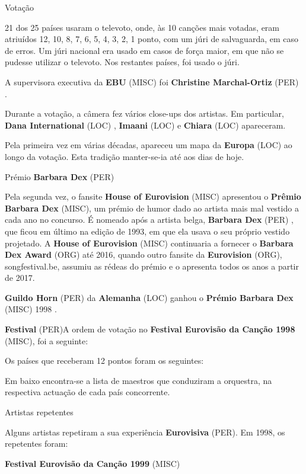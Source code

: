 \documentclass[12pt,a4paper]{article}
\begin{document}
Votação

21 dos 25 países usaram o televoto, onde, às 10 canções mais votadas, eram atriuídos 12, 10, 8, 7, 6, 5, 4, 3, 2, 1 ponto, com um júri de salvaguarda, em caso de erros. Um júri nacional era usado em casos de força maior, em que não se pudesse utilizar o televoto. Nos restantes países, foi usado o júri.

A supervisora executiva da \textbf{EBU} (MISC) foi \textbf{Christine Marchal-Ortiz} (PER) .

Durante a votação, a câmera fez vários close-ups dos artistas. Em particular, \textbf{Dana International} (LOC) , \textbf{Imaani} (LOC) e \textbf{Chiara} (LOC) apareceram.

Pela primeira vez em várias décadas, apareceu um mapa da \textbf{Europa} (LOC) ao longo da votação. Esta tradição manter-se-ia até aos dias de hoje.



Prémio \textbf{Barbara Dex} (PER)

Pela segunda vez, o fansite \textbf{House of Eurovision} (MISC) apresentou o \textbf{Prêmio Barbara Dex} (MISC), um prémio de humor dado ao artista mais mal vestido a cada ano no concurso. É nomeado após a artista belga, \textbf{Barbara Dex} (PER) , que ficou em último na edição de 1993, em que ela usava o seu próprio vestido projetado. A \textbf{House of Eurovision} (MISC) continuaria a fornecer o \textbf{Barbara Dex Award} (ORG) até 2016, quando outro fansite da \textbf{Eurovision} (ORG), songfestival.be, assumiu as rédeas do prémio e o apresenta todos os anos a partir de 2017.

\textbf{Guildo Horn} (PER) da \textbf{Alemanha} (LOC) ganhou o \textbf{Prémio Barbara Dex} (MISC) 1998 .



\textbf{Festival} (PER)A ordem de votação no \textbf{Festival Eurovisão da Canção 1998} (MISC), foi a seguinte:

Os países que receberam 12 pontos foram os seguintes:

Em baixo encontra-se a lista de maestros que conduziram a orquestra, na respectiva actuação de cada país concorrente.



Artistas repetentes

Alguns artistas repetiram a sua experiência \textbf{Eurovisiva} (PER). Em 1998, os repetentes foram:



\textbf{Festival Eurovisão da Canção 1999} (MISC)
\end{document}
